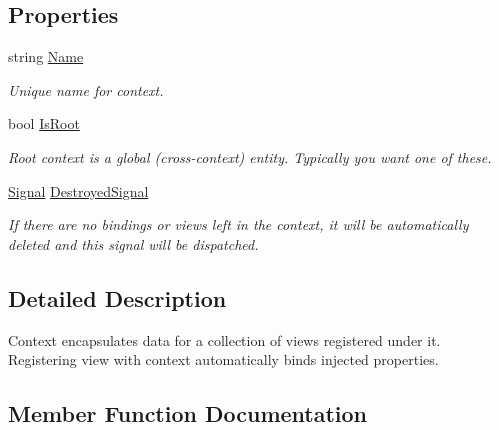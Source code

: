 \subsection*{Properties}
\begin{DoxyCompactItemize}
\item 
string \mbox{\hyperlink{interfacecp_games_1_1core_1_1_rapid_m_v_c_1_1_i_context_a75d949e147b0c638729e455a99d361bc}{Name}}
\begin{DoxyCompactList}\small\item\em Unique name for context. \end{DoxyCompactList}\item 
bool \mbox{\hyperlink{interfacecp_games_1_1core_1_1_rapid_m_v_c_1_1_i_context_ac7e05700419090786a56b92d64a35728}{Is\+Root}}
\begin{DoxyCompactList}\small\item\em Root context is a global (cross-\/context) entity. Typically you want one of these. \end{DoxyCompactList}\item 
\mbox{\hyperlink{classcp_games_1_1core_1_1_rapid_m_v_c_1_1_signal}{Signal}} \mbox{\hyperlink{interfacecp_games_1_1core_1_1_rapid_m_v_c_1_1_i_context_a59f314929b2f01751bdf6f2a00586e80}{Destroyed\+Signal}}
\begin{DoxyCompactList}\small\item\em If there are no bindings or views left in the context, it will be automatically deleted and this signal will be dispatched. \end{DoxyCompactList}\end{DoxyCompactItemize}


\subsection{Detailed Description}
Context encapsulates data for a collection of views registered under it. Registering view with context automatically binds injected properties. 



\subsection{Member Function Documentation}
\mbox{\label{interfacecp_games_1_1core_1_1_rapid_m_v_c_1_1_i_context_ad0fae0753ef27d6972af6cdddabbec0d}} 
